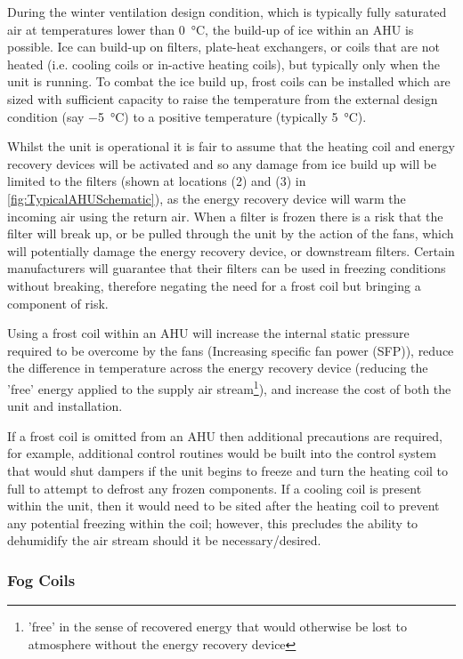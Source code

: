 During the winter ventilation design condition, which is typically fully saturated air at temperatures lower than \SI{0}{\celsius}, the build-up of ice within an AHU is possible.  Ice can build-up on filters, plate-heat exchangers, or coils that are not heated (i.e. cooling coils or in-active heating coils), but typically only when the unit is running.  To combat the ice build up, frost coils can be installed which are sized with sufficient capacity to raise the temperature from the external design condition (say \SI{-5}{\celsius}) to a positive temperature (typically \SI{5}{\celsius}).

Whilst the unit is operational it is fair to assume that the heating coil and energy recovery devices will be activated and so any damage from ice build up will be limited to the filters (shown at locations (2) and (3) in \autoref{fig:TypicalAHUSchematic}), as the energy recovery device will warm the incoming air using the return air.  When a filter is frozen there is a risk that the filter will break up, or be pulled through the unit by the action of the fans, which will potentially damage the energy recovery device, or downstream filters.  Certain manufacturers will guarantee that their filters can be used in freezing conditions without breaking, therefore negating the need for a frost coil but bringing a component of risk.

Using a frost coil within an AHU will increase the internal static pressure required to be overcome by the fans (Increasing specific fan power (SFP)), reduce the difference in temperature across the energy recovery device (reducing the 'free' energy applied to the supply air stream\footnote{'free' in the sense of recovered energy that would otherwise be lost to atmosphere without the energy recovery device}), and increase the cost of both the unit and installation.

If a frost coil is omitted from an AHU then additional precautions are required, for example, additional control routines would be built into the control system that would shut dampers if the unit begins to freeze and turn the heating coil to full to attempt to defrost any frozen components.  If a cooling coil is present within the unit, then it would need to be sited after the heating coil to prevent any potential freezing within the coil; however, this precludes the ability to dehumidify the air stream should it be necessary/desired.

\subsubsection{Fog Coils}

